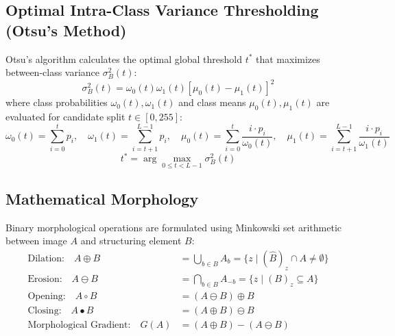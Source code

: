 \documentclass[12pt,a4paper]{article}
\begin{document}
\subsection{Optimal Intra-Class Variance Thresholding (Otsu's Method)}
Otsu's algorithm calculates the optimal global threshold $t^*$ that maximizes between-class variance $\sigma_B^2(t)$:
\begin{equation}
\sigma_B^2(t) = \omega_0(t)\omega_1(t) \left[ \mu_0(t) - \mu_1(t) \right]^2
\end{equation}
where class probabilities $\omega_0(t), \omega_1(t)$ and class means $\mu_0(t), \mu_1(t)$ are evaluated for candidate split $t \in [0, 255]$:
\begin{equation}
\omega_0(t) = \sum_{i=0}^{t} p_i, \quad \omega_1(t) = \sum_{i=t+1}^{L-1} p_i, \quad \mu_0(t) = \sum_{i=0}^{t} \frac{i \cdot p_i}{\omega_0(t)}, \quad \mu_1(t) = \sum_{i=t+1}^{L-1} \frac{i \cdot p_i}{\omega_1(t)}
\end{equation}
\begin{equation}
t^* = \arg\max_{0 \le t < L-1} \sigma_B^2(t)
\end{equation}

\subsection{Mathematical Morphology}
Binary morphological operations are formulated using Minkowski set arithmetic between image $A$ and structuring element $B$:
\begin{align}
\text{Dilation:} \quad A \oplus B &= \bigcup_{b \in B} A_b = \{ z \mid (\hat{B})_z \cap A \ne \emptyset \} \\
\text{Erosion:} \quad A \ominus B &= \bigcap_{b \in B} A_{-b} = \{ z \mid (B)_z \subseteq A \} \\
\text{Opening:} \quad A \circ B &= (A \ominus B) \oplus B \\
\text{Closing:} \quad A \bullet B &= (A \oplus B) \ominus B \\
\text{Morphological Gradient:} \quad G(A) &= (A \oplus B) - (A \ominus B)
\end{align}
\end{document}
